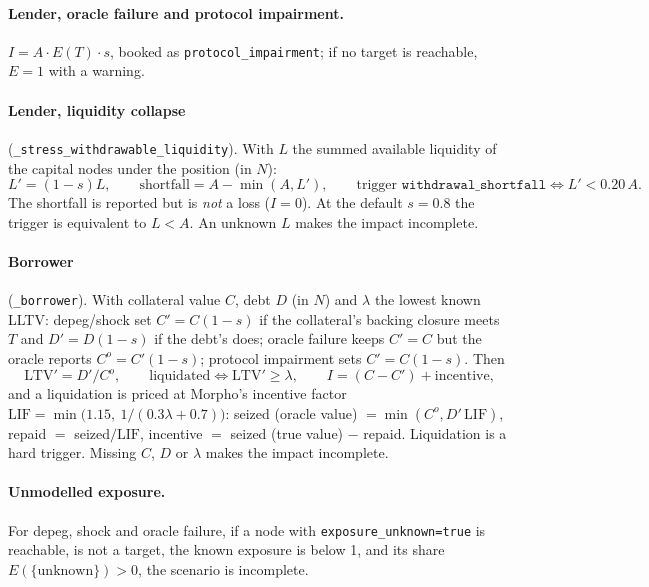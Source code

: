 \documentclass[11pt,a4paper]{article}
\newcommand{\code}[1]{\texttt{#1}}
\begin{document}
\paragraph{Lender, oracle failure and protocol impairment.}
$I=A\cdot E(T)\cdot s$, booked as \code{protocol\_impairment}; if no target is
reachable, $E=1$ with a warning.

\paragraph{Lender, liquidity collapse} (\code{\_stress\_withdrawable\_liquidity}).
With $L$ the summed available liquidity of the capital nodes under the position
(in $N$):
\begin{equation}
L'=(1-s)L,\qquad \text{shortfall}=A-\min(A,L'),\qquad
\text{trigger }\code{withdrawal\_shortfall}\iff L'<0.20\,A.
\end{equation}
The shortfall is reported but is \emph{not} a loss ($I=0$). At the default
$s=0.8$ the trigger is equivalent to $L<A$. An unknown $L$ makes the impact
incomplete.

\paragraph{Borrower} (\code{\_borrower}). With collateral value $C$, debt $D$ (in
$N$) and $\lambda$ the lowest known LLTV: depeg/shock set $C'=C(1-s)$ if the
collateral's backing closure meets $T$ and $D'=D(1-s)$ if the debt's does; oracle
failure keeps $C'=C$ but the oracle reports $C^{o}=C'(1-s)$; protocol impairment
sets $C'=C(1-s)$. Then
\begin{equation}
\text{LTV}'=D'/C^{o},\qquad \text{liquidated}\iff \text{LTV}'\geq\lambda,\qquad
I=(C-C')+\text{incentive},
\end{equation}
and a liquidation is priced at Morpho's incentive factor
$\text{LIF}=\min\big(1.15,\ 1/(0.3\lambda+0.7)\big)$: seized (oracle value)
$=\min(C^{o},D'\,\text{LIF})$, repaid $=$ seized$/\text{LIF}$, incentive $=$
seized (true value) $-$ repaid. Liquidation is a hard trigger. Missing $C$, $D$ or
$\lambda$ makes the impact incomplete.

\paragraph{Unmodelled exposure.} For depeg, shock and oracle failure, if a node
with \code{exposure\_unknown=true} is reachable, is not a target, the known
exposure is below 1, and its share $E(\{\text{unknown}\})>0$, the scenario is
incomplete.
\end{document}
